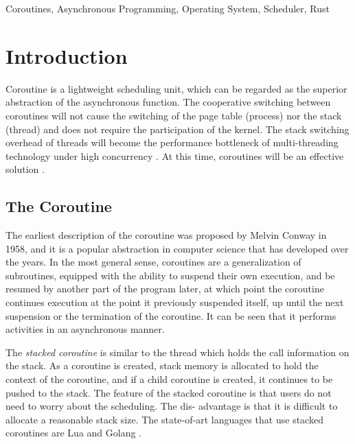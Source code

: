\documentclass[conference]{IEEEtran}
\begin{document}
\begin{IEEEkeywords}
Coroutines, Asynchronous Programming, Operating System, Scheduler, Rust
\end{IEEEkeywords}

\section{Introduction}

Coroutine is a lightweight scheduling unit, which can be regarded as the superior abstraction of the asynchronous function. The cooperative switching between coroutines will not cause the switching of the page table (process) nor the stack (thread) and does not require the participation of the kernel. The stack switching overhead of threads will become the performance bottleneck of multi-threading technology under high concurrency \cite{hwu2008concurrency}. At this time, coroutines will be an effective solution  \cite{belson2019survey} .

\subsection{The Coroutine}

The earliest description of the coroutine was proposed by Melvin Conway \cite{conway1963design} in 1958, and it is a popular abstraction in computer science that has developed over the years. In the most general sense, coroutines \cite{waern2021coroutines, moura2009revisiting} are a generalization of subroutines, equipped with the ability to suspend their own execution, and be resumed by another part of the program later, at which point the coroutine continues execution at the point it previously suspended itself, up until the next suspension or the termination of the coroutine. It can be seen that it performs activities in an asynchronous manner.

The \emph{stacked coroutine} \cite{WANG2022102980} is similar to the thread which holds the call information on the stack. As a coroutine is created, stack memory is allocated to hold the context of the coroutine, and if a child coroutine is created, it continues to be pushed to the stack. The feature of the stacked coroutine is that users do not need to worry about the scheduling. The dis- advantage is that it is difficult to allocate a reasonable stack size. The state-of-art languages that use stacked coroutines are Lua \cite{de2004coroutines} and Golang \cite{prabhakar2011concurrent}.
\end{document}
